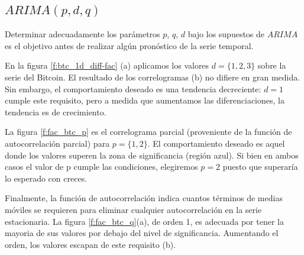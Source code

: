 \documentclass[a4paper,10pt]{article}
\begin{document}
\subsection{$ARIMA(p,d,q)$}

Determinar adecuadamente los parámetros $p$, $q$, $d$ bajo los supuestos de $ARIMA$ es el objetivo antes de realizar algún pronóstico de la serie temporal.

En la figura \ref{f:btc_1d_diff-fac} (a) aplicamos los valores $d=\{1,2,3\}$ sobre la serie del Bitcoin. El resultado de los correlogramas (b) no difiere en gran medida. Sin embargo, el comportamiento deseado es una tendencia decreciente: $d=1$ cumple este requisito, pero a medida que aumentamos las diferenciaciones, la tendencia es de crecimiento.

La figura \ref{f:fac_btc_p} es el correlograma parcial (proveniente de la función de autocorrelación parcial) para $p=\{1,2\}$. El comportamiento deseado es aquel donde los valores superen la zona de significancia (región azul). Si bien en ambos casos el valor de p cumple las condiciones, elegiremos $p=2$ puesto que superaría lo esperado con creces.

Finalmente, la función de autocorrelación indica cuantos términos de medias móviles se requieren para eliminar cualquier autocorrelación en la serie estacionaria. La figura \ref{f:fac_btc_q}(a), de orden 1, es adecuada por tener la mayoria de sus valores por debajo del nivel de significancia. Aumentando el orden, los valores escapan de este requisito (b).
\end{document}

